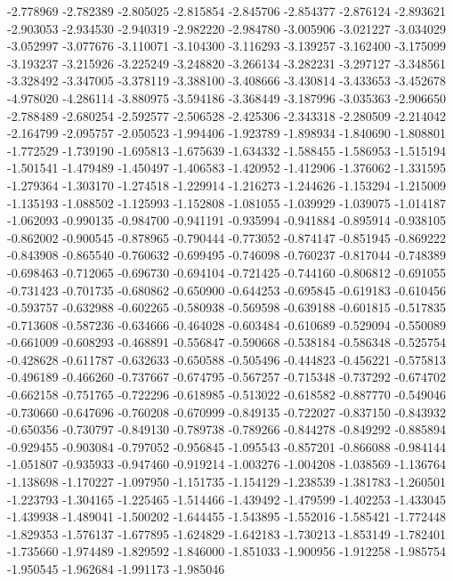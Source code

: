 -2.778969
-2.782389
-2.805025
-2.815854
-2.845706
-2.854377
-2.876124
-2.893621
-2.903053
-2.934530
-2.940319
-2.982220
-2.984780
-3.005906
-3.021227
-3.034029
-3.052997
-3.077676
-3.110071
-3.104300
-3.116293
-3.139257
-3.162400
-3.175099
-3.193237
-3.215926
-3.225249
-3.248820
-3.266134
-3.282231
-3.297127
-3.348561
-3.328492
-3.347005
-3.378119
-3.388100
-3.408666
-3.430814
-3.433653
-3.452678
-4.978020
-4.286114
-3.880975
-3.594186
-3.368449
-3.187996
-3.035363
-2.906650
-2.788489
-2.680254
-2.592577
-2.506528
-2.425306
-2.343318
-2.280509
-2.214042
-2.164799
-2.095757
-2.050523
-1.994406
-1.923789
-1.898934
-1.840690
-1.808801
-1.772529
-1.739190
-1.695813
-1.675639
-1.634332
-1.588455
-1.586953
-1.515194
-1.501541
-1.479489
-1.450497
-1.406583
-1.420952
-1.412906
-1.376062
-1.331595
-1.279364
-1.303170
-1.274518
-1.229914
-1.216273
-1.244626
-1.153294
-1.215009
-1.135193
-1.088502
-1.125993
-1.152808
-1.081055
-1.039929
-1.039075
-1.014187
-1.062093
-0.990135
-0.984700
-0.941191
-0.935994
-0.941884
-0.895914
-0.938105
-0.862002
-0.900545
-0.878965
-0.790444
-0.773052
-0.874147
-0.851945
-0.869222
-0.843908
-0.865540
-0.760632
-0.699495
-0.746098
-0.760237
-0.817044
-0.748389
-0.698463
-0.712065
-0.696730
-0.694104
-0.721425
-0.744160
-0.806812
-0.691055
-0.731423
-0.701735
-0.680862
-0.650900
-0.644253
-0.695845
-0.619183
-0.610456
-0.593757
-0.632988
-0.602265
-0.580938
-0.569598
-0.639188
-0.601815
-0.517835
-0.713608
-0.587236
-0.634666
-0.464028
-0.603484
-0.610689
-0.529094
-0.550089
-0.661009
-0.608293
-0.468891
-0.556847
-0.590668
-0.538184
-0.586348
-0.525754
-0.428628
-0.611787
-0.632633
-0.650588
-0.505496
-0.444823
-0.456221
-0.575813
-0.496189
-0.466260
-0.737667
-0.674795
-0.567257
-0.715348
-0.737292
-0.674702
-0.662158
-0.751765
-0.722296
-0.618985
-0.513022
-0.618582
-0.887770
-0.549046
-0.730660
-0.647696
-0.760208
-0.670999
-0.849135
-0.722027
-0.837150
-0.843932
-0.650356
-0.730797
-0.849130
-0.789738
-0.789266
-0.844278
-0.849292
-0.885894
-0.929455
-0.903084
-0.797052
-0.956845
-1.095543
-0.857201
-0.866088
-0.984144
-1.051807
-0.935933
-0.947460
-0.919214
-1.003276
-1.004208
-1.038569
-1.136764
-1.138698
-1.170227
-1.097950
-1.151735
-1.154129
-1.238539
-1.381783
-1.260501
-1.223793
-1.304165
-1.225465
-1.514466
-1.439492
-1.479599
-1.402253
-1.433045
-1.439938
-1.489041
-1.500202
-1.644455
-1.543895
-1.552016
-1.585421
-1.772448
-1.829353
-1.576137
-1.677895
-1.624829
-1.642183
-1.730213
-1.853149
-1.782401
-1.735660
-1.974489
-1.829592
-1.846000
-1.851033
-1.900956
-1.912258
-1.985754
-1.950545
-1.962684
-1.991173
-1.985046

